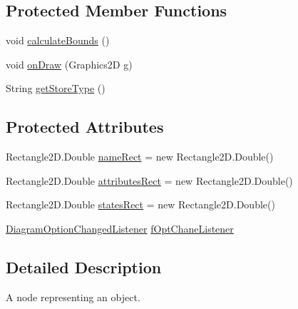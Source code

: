 \subsection*{Protected Member Functions}
\begin{DoxyCompactItemize}
\item 
void \hyperlink{classorg_1_1tzi_1_1use_1_1gui_1_1views_1_1diagrams_1_1objectdiagram_1_1_object_node_a9ca648fb14de8a49aacf04340d207076}{calculate\-Bounds} ()
\item 
void \hyperlink{classorg_1_1tzi_1_1use_1_1gui_1_1views_1_1diagrams_1_1objectdiagram_1_1_object_node_a03d3f69c84478dc74dac175ff7e8c980}{on\-Draw} (Graphics2\-D g)
\item 
String \hyperlink{classorg_1_1tzi_1_1use_1_1gui_1_1views_1_1diagrams_1_1objectdiagram_1_1_object_node_aa9a7f12eaafdff70f9e36a74b82b9edc}{get\-Store\-Type} ()
\end{DoxyCompactItemize}
\subsection*{Protected Attributes}
\begin{DoxyCompactItemize}
\item 
Rectangle2\-D.\-Double \hyperlink{classorg_1_1tzi_1_1use_1_1gui_1_1views_1_1diagrams_1_1objectdiagram_1_1_object_node_a74d6845e2f2840bdb58100c0463b6712}{name\-Rect} = new Rectangle2\-D.\-Double()
\item 
Rectangle2\-D.\-Double \hyperlink{classorg_1_1tzi_1_1use_1_1gui_1_1views_1_1diagrams_1_1objectdiagram_1_1_object_node_a56cc28bc25d24beba846593625346792}{attributes\-Rect} = new Rectangle2\-D.\-Double()
\item 
Rectangle2\-D.\-Double \hyperlink{classorg_1_1tzi_1_1use_1_1gui_1_1views_1_1diagrams_1_1objectdiagram_1_1_object_node_abe64f505a16802b36c9cade79ed3a772}{states\-Rect} = new Rectangle2\-D.\-Double()
\item 
\hyperlink{interfaceorg_1_1tzi_1_1use_1_1gui_1_1views_1_1diagrams_1_1_diagram_option_changed_listener}{Diagram\-Option\-Changed\-Listener} \hyperlink{classorg_1_1tzi_1_1use_1_1gui_1_1views_1_1diagrams_1_1objectdiagram_1_1_object_node_aa41bb61b2ea8b62feb47bb28cd90d25f}{f\-Opt\-Chane\-Listener}
\end{DoxyCompactItemize}


\subsection{Detailed Description}
A node representing an object.

